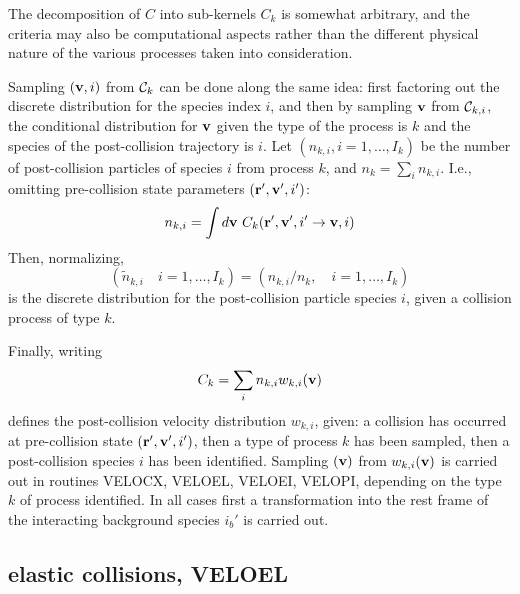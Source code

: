 The decomposition of $C$ into sub-kernels $C_k$ is somewhat arbitrary, and the
criteria may also be computational aspects rather than the different physical
nature of the various processes taken into consideration.

Sampling $(\mathbf{v},i)$ from ${\cal{C}}_k$ can be done along the same idea: first
factoring out the discrete distribution for the species index $i$, and then by
sampling $\mathbf{v}$ from ${\cal{C}}_{k,i}$, the conditional distribution for $\mathbf{v}$
given the type of the process is $k$ and the species of the post-collision
trajectory is $i$.
Let $(n_{k,i}, i = 1, \dots, I_k)$ be the number of post-collision particles of
species $i$ from process $k$, and $n_k = \sum_{i} n_{k,i}$.
I.e., omitting pre-collision state parameters $(\mathbf{r} ', \mathbf{v} ', i ')$:
\begin{displaymath}
  n_{k,i} = \int d \mathbf{v} \ C_k (
  \mathbf{r} ', \mathbf{v} ', i ' \rightarrow
  \mathbf{v}, i )
\end{displaymath}
Then, normalizing,
\begin{displaymath}
  (\tilde{n}_{k,i} \quad i = 1, \dots,
  I_k) = (n_{k,i}/n_k, \quad i = 1, \dots, I_k)
\end{displaymath}
is the discrete
distribution for the post-collision particle species $i$, given a collision
process of type $k$.

Finally, writing
\begin{displaymath}
  C_{k} = \sum_i n_{k,i} w_{k,i}(\mathbf{v})
\end{displaymath}
defines the post-collision velocity distribution $w_{k,i}$,
given: a collision has occurred at pre-collision state $(\mathbf{r} ', \mathbf{v} ', i ')$,
then a type of process $k$ has been sampled, then a post-collision species $i$
has been identified.
Sampling $(\mathbf{v})$ from $w_{k,i}(\mathbf{v})$ is carried out in routines VELOCX, VELOEL,
VELOEI, VELOPI, depending on the type $k$ of process identified.
In all cases first a transformation into the rest frame of the interacting
background species $i_b'$ is carried out.

\subsection{elastic collisions, VELOEL}


